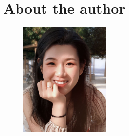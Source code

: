 \chapter{About the author}

\begin{figure}
  \begin{center}
    \includegraphics[width=0.4\textwidth]{img/chang_profile.jpg}
  \end{center}
\end{figure}



  